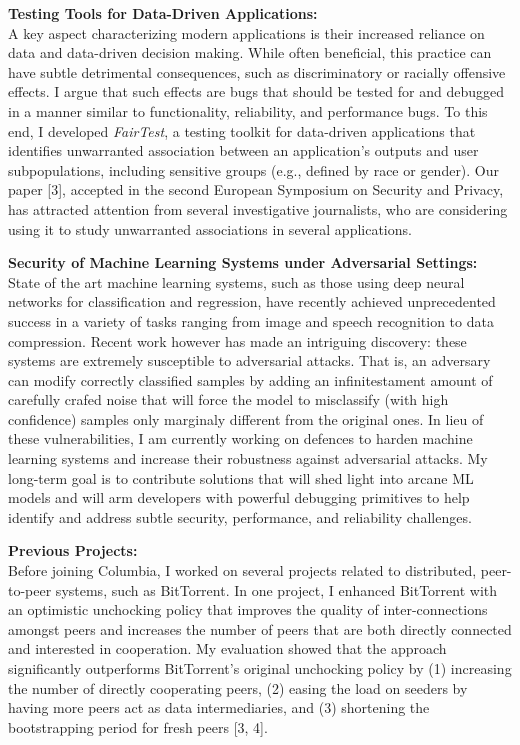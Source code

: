 \documentclass[overlapped,9pt]{res}
\begin{document}
\begin{resume}
\textbf{Testing Tools for Data-Driven Applications:}\\
A key aspect characterizing modern applications is their increased reliance on
data and data-driven decision making.  While often beneficial, this practice can
have subtle detrimental consequences, such as discriminatory or racially
offensive effects. I argue that such effects are bugs that should be tested for
and debugged in a manner similar to functionality, reliability, and performance
bugs. To this end, I developed {\em FairTest}, a testing toolkit for data-driven
applications that identifies unwarranted association between an application’s
outputs and user subpopulations, including sensitive groups (e.g., defined by
race or gender). Our paper [3], accepted in the second European Symposium on
Security and Privacy, has attracted attention from several investigative
journalists, who are considering using it to study unwarranted associations in
several applications.

\textbf{Security of Machine Learning Systems under Adversarial Settings:}\\
State of the art machine learning systems, such as those using deep neural
networks for classification and regression, have recently achieved
unprecedented success in a variety of tasks ranging from image and speech
recognition to data compression.
Recent work however has made an intriguing discovery: these systems are
extremely susceptible to adversarial attacks.
That is, an adversary can modify correctly classified samples by adding an
infinitestament amount of carefully crafed noise that will force the model
to misclassify (with high confidence) samples only marginaly different from the
original ones.
In lieu of
these vulnerabilities, I am currently working on defences to harden machine
learning systems and increase their robustness against adversarial attacks.
My long-term goal is to contribute solutions that will shed light
into arcane ML models and will arm developers with powerful debugging primitives
to help identify and address subtle security, performance, and reliability
challenges.

\textbf{Previous Projects:}\\
Before joining Columbia, I worked on several projects related to distributed,
peer-to-peer systems, such as BitTorrent. In one project, I enhanced
BitTorrent with an optimistic unchocking policy that improves the quality of
inter-connections amongst peers and increases the number of peers that are both
directly connected and interested in cooperation. My evaluation showed that the
approach significantly outperforms BitTorrent's original unchocking policy by
(1) increasing the number of directly cooperating peers, (2) easing the load on
seeders by having more peers act as data intermediaries, and (3) shortening the
bootstrapping period for fresh peers [3, 4].



\end{resume}
\end{document}
